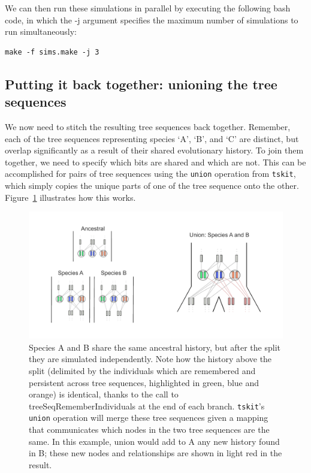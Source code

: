 \documentclass[12pt]{article}
\newcommand{\tskit}[0]{\texttt{tskit}\xspace}
\begin{document}
We can then run these simulations in parallel by executing the following bash code,
in which the -j argument specifies the maximum number of simulations to run simultaneously:
\begin{verbatim}
make -f sims.make -j 3
\end{verbatim}

\subsection{Putting it back together: unioning the tree sequences}

We now need to stitch the resulting tree sequences back together.
Remember, each of the tree sequences representing species `A', `B', and `C'
are distinct, but overlap significantly as a result of their shared evolutionary history.
To join them together, we need to specify which bits are shared and which are not.
This can be accomplished for pairs of tree sequences using the \verb|union| operation from \tskit,
which simply copies the unique parts of one of the tree sequence onto the other.
Figure~\ref{fig:union} illustrates how this works.

\begin{figure}[h!]
    \centering
     \includegraphics[width=\textwidth]{figures/union.pdf}
     \caption{
         Species A and B share the same ancestral history, but after the split they are simulated independently.
         Note how the history above the split (delimited by the individuals which are remembered and persistent across tree sequences, highlighted in green, blue and orange) is identical,
         thanks to the call to treeSeqRememberIndividuals at the end of each branch.
     \tskit's \texttt{union} operation will merge these tree sequences given a mapping that communicates which nodes in the two tree sequences are the same.
     In this example, union would add to A any new history found in B;
     these new nodes and relationships are shown in light red in the result.
     \label{fig:union}
     }
\end{figure}
\end{document}
